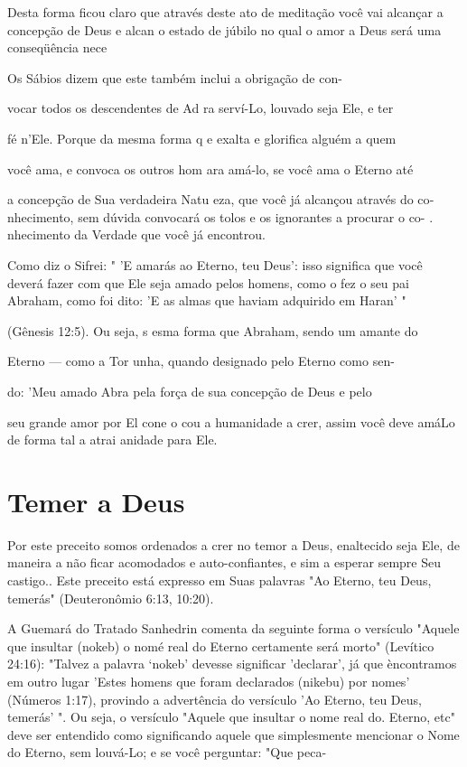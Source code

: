 \begin{itemize}
\begin{enumrate}
\begin{itemize}
Desta forma ficou claro que através deste ato de meditação você vai
alcançar a concepção de Deus e alcan o estado de júbilo no qual o amor a
Deus será uma conseqüência nece


Os Sábios dizem que este também inclui a obrigação de con-


vocar todos os descendentes de Ad ra serví-Lo, louvado seja Ele, e ter

fé n'Ele. Porque da mesma forma q e exalta e glorifica alguém a quem

você ama, e convoca os outros hom ara amá-lo, se você ama o Eterno até

a concepção de Sua verdadeira Natu eza, que você já alcançou através do
co­nhecimento, sem dúvida convocará os tolos e os ignorantes a procurar
o co- . nhecimento da Verdade que você já encontrou.

Como diz o Sifrei: " 'E amarás ao Eterno, teu Deus': isso significa que
você deverá fazer com que Ele seja amado pelos homens, como o fez o seu
pai Abraham, como foi dito: 'E as almas que haviam adquirido em Haran' "

(Gênesis 12:5). Ou seja, s esma forma que Abraham, sendo um amante do

Eterno --- como a Tor unha, quando designado pelo Eterno como sen-

do: 'Meu amado Abra pela força de sua concepção de Deus e pelo

seu grande amor por El cone o cou a humanidade a crer, assim você deve
amá­Lo de forma tal a atrai anidade para Ele.

\section{Temer a Deus}

Por este preceito somos ordenados a crer no temor a Deus, enalteci­do
seja Ele, de maneira a não ficar acomodados e auto-confiantes, e sim a
espe­rar sempre Seu castigo.. Este preceito está expresso em Suas
palavras "Ao Eter­no, teu Deus, temerás" (Deuteronômio 6:13, 10:20).

A Guemará do Tratado Sanhedrin comenta da seguinte forma o ver­sículo
"Aquele que insultar (nokeb) o nomé real do Eterno certamente será
mor­to" (Levítico 24:16): "Talvez a palavra `nokeb' devesse significar
'declarar', já que èncontramos em outro lugar 'Estes homens que foram
declarados (nikebu) por nomes' (Números 1:17), provindo a advertência do
versículo 'Ao Eterno, teu Deus, temerás' ". Ou seja, o versículo "Aquele
que insultar o nome real do. Eterno, etc" deve ser
entendido como significando aquele que simplesmente mencionar o Nome do
Eterno, sem louvá-Lo; e se você perguntar: "Que peca-


\end{itemize}
\end{enumrate}
\end{itemize}
